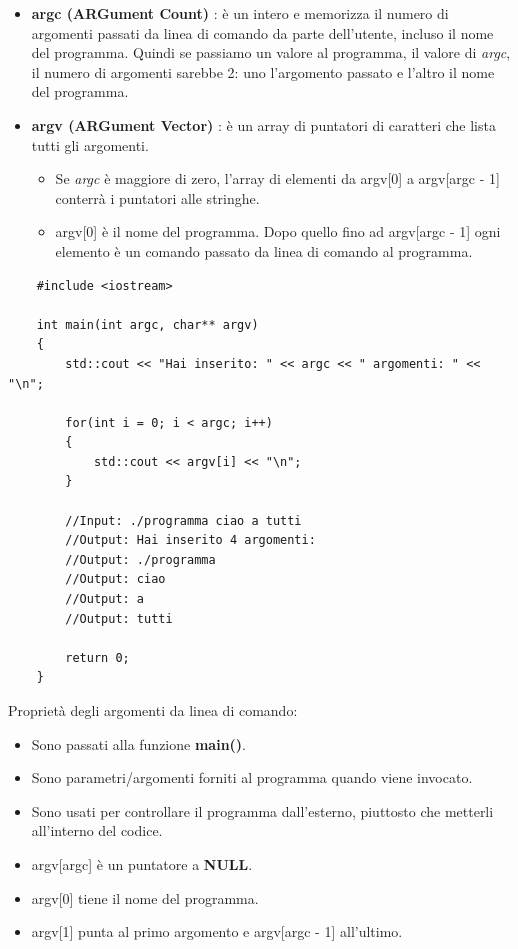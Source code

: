 \begin{itemize}
	\item \textsf{\small \textbf{argc (ARGument Count)} : è un intero e memorizza il numero di argomenti passati da linea di comando da parte dell'utente, incluso il nome del programma. Quindi se passiamo un valore al programma, il valore di \emph{argc}, il numero di argomenti sarebbe 2: uno l'argomento passato e l'altro il nome del programma.} \\
	\item \textsf{\small \textbf{argv (ARGument Vector)} : è un array di puntatori di caratteri che lista tutti gli argomenti.} \\
	\begin{itemize}
		\item \textsf{\small Se \emph{argc} è maggiore di zero, l'array di elementi da argv[0] a argv[argc - 1] conterrà i puntatori alle stringhe.}
		\item \textsf{\small argv[0] è il nome del programma. Dopo quello fino ad argv[argc - 1] ogni elemento è un comando passato da linea di comando al programma.}
	\end{itemize}
\end{itemize}

\begin{lstlisting}
	#include <iostream>
	
	int main(int argc, char** argv)
	{
		std::cout << "Hai inserito: " << argc << " argomenti: " << "\n";
		
		for(int i = 0; i < argc; i++)
		{
			std::cout << argv[i] << "\n";
		}
		
		//Input: ./programma ciao a tutti
		//Output: Hai inserito 4 argomenti:
		//Output: ./programma
		//Output: ciao
		//Output: a
		//Output: tutti
		
		return 0;
	}
\end{lstlisting}

\textsf{\small Proprietà degli argomenti da linea di comando: } \\

\begin{itemize}
	\item \textsf{\small Sono passati alla funzione \textbf{main()}.}
	\item \textsf{\small Sono parametri/argomenti forniti al programma quando viene invocato.}
	\item \textsf{\small Sono usati per controllare il programma dall'esterno, piuttosto che metterli all'interno del codice.}
	\item \textsf{\small argv[argc] è un puntatore a \textbf{NULL}.}
	\item \textsf{\small argv[0] tiene il nome del programma.}
	\item \textsf{\small argv[1] punta al primo argomento e argv[argc - 1] all'ultimo.}
\end{itemize}

